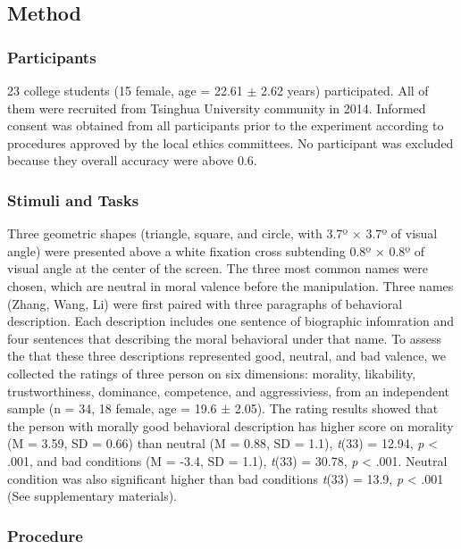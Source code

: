 \documentclass[man]{apa6}
\begin{document}
\hypertarget{method-1}{%
\subsection{Method}\label{method-1}}

\hypertarget{participants-2}{%
\subsubsection{Participants}\label{participants-2}}

23 college students (15 female, age = 22.61 \(\pm\) 2.62 years) participated. All of them were recruited from Tsinghua University community in 2014. Informed consent was obtained from all participants prior to the experiment according to procedures approved by the local ethics committees. No participant was excluded because they overall accuracy were above 0.6.

\hypertarget{stimuli-and-tasks-2}{%
\subsubsection{Stimuli and Tasks}\label{stimuli-and-tasks-2}}

Three geometric shapes (triangle, square, and circle, with 3.7º × 3.7º of visual angle) were presented above a white fixation cross subtending 0.8º × 0.8º of visual angle at the center of the screen. The three most common names were chosen, which are neutral in moral valence before the manipulation.
Three names (Zhang, Wang, Li) were first paired with three paragraphs of behavioral description. Each description includes one sentence of biographic infomration and four sentences that describing the moral behavioral under that name. To assess the that these three descriptions represented good, neutral, and bad valence, we collected the ratings of three person on six dimensions: morality, likability, trustworthiness, dominance, competence, and aggressiviess, from an independent sample (n = 34, 18 female, age = 19.6 ± 2.05). The rating results showed that the person with morally good behavioral description has higher score on morality (M = 3.59, SD = 0.66) than neutral (M = 0.88, SD = 1.1), \emph{t}(33) = 12.94, \emph{p} \textless{} .001, and bad conditions (M = -3.4, SD = 1.1), \emph{t}(33) = 30.78, \emph{p} \textless{} .001. Neutral condition was also significant higher than bad conditions \emph{t}(33) = 13.9, \emph{p} \textless{} .001 (See supplementary materials).

\hypertarget{procedure-2}{%
\subsubsection{Procedure}\label{procedure-2}}
\end{document}
